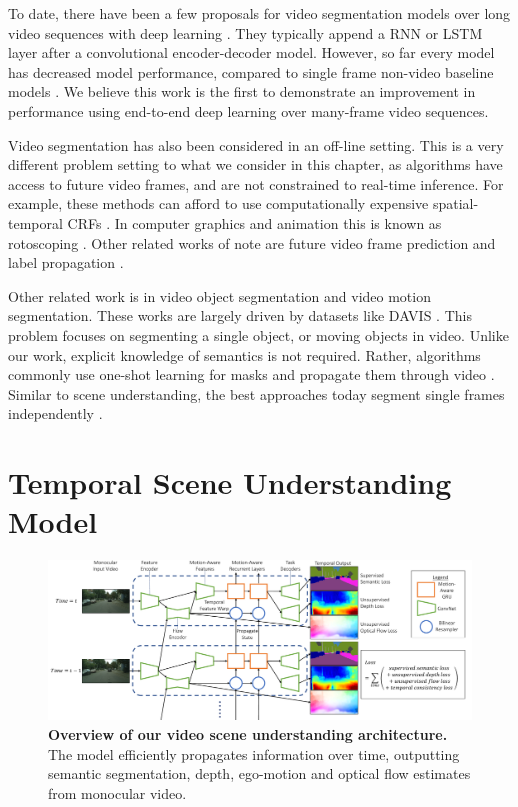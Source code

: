 To date, there have been a few proposals for video segmentation models over long video sequences with deep learning \citep{patraucean2015spatio,valipour2017recurrent}. They typically append a RNN or LSTM layer after a convolutional encoder-decoder model. However, so far every model has decreased model performance, compared to single frame non-video baseline models \citep{patraucean2015spatio,valipour2017recurrent}. We believe this work is the first to demonstrate an improvement in performance using end-to-end deep learning over many-frame video sequences.

Video segmentation has also been considered in an off-line setting. This is a very different problem setting to what we consider in this chapter, as algorithms have access to future video frames, and are not constrained to real-time inference. For example, these methods can afford to use computationally expensive spatial-temporal CRFs \citep{kundu2016feature}. In computer graphics and animation this is known as rotoscoping \citep{miksik2017roam}. Other related works of note are future video frame prediction \citep{luc2017predicting} and label propagation \citep{budvytis2010label}.

Other related work is in video object segmentation and video motion segmentation. These works are largely driven by datasets like DAVIS \citep{Perazzi2016}. This problem focuses on segmenting a single object, or moving objects \citep{tsai2016video,tokmakov2017learning,vertens2017smsnet} in video. Unlike our work, explicit knowledge of semantics is not required. Rather, algorithms commonly use one-shot learning for masks and propagate them through video \citep{voigtlaender17BMVC}. Similar to scene understanding, the best approaches today segment single frames independently \citep{caelles2017one,khoreva2016learning}.

\section{Temporal Scene Understanding Model}
\label{sec:video_model}

\begin{figure}[!t]
\begin{center}
\includegraphics[width=\linewidth]{temporal_model.pdf}
\end{center}
\vspace{-5mm}
   \caption[Video scene understanding architecture.]{\textbf{Overview of our video scene understanding architecture.} The model efficiently propagates information over time, outputting semantic segmentation, depth, ego-motion and optical flow estimates from monocular video.}
\label{fig:arch}
\vspace{-2mm}
\end{figure}

